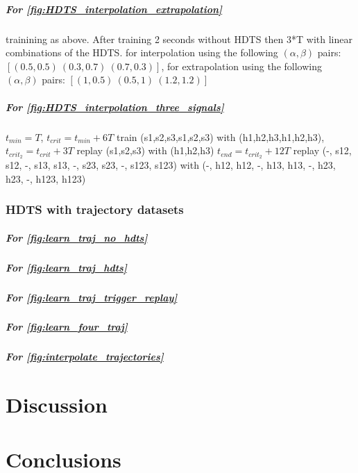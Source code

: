 \documentclass[10pt,a4paper, final]{report} %
\begin{document}
\paragraph{For \autoref{fig:HDTS_interpolation_extrapolation}}
trainining as above. After training 2 seconds without HDTS then 3*T with linear combinations of the HDTS. 
for interpolation using the following $(\alpha, \beta)$ pairs: $[(0.5,0.5)\ (0.3,0.7)\ (0.7,0.3)]$,
for extrapolation using the following $(\alpha, \beta)$ pairs: $[(1, 0.5)\ (0.5, 1)\ (1.2, 1.2)]$

\paragraph{For \autoref{fig:HDTS_interpolation_three_signals}}
$t_{min} = T$,
$t_{crit} = t_{min} + 6 T$ train (s1,s2,s3,s1,s2,s3) with (h1,h2,h3,h1,h2,h3),
$t_{crit_2} = t_{crit} + 3 T$ replay (s1,s2,s3) with (h1,h2,h3)
$t_{end} = t_{crit_2} + 12 T$ replay (-, s12, s12, -, s13, s13, -, s23, s23, -, s123, s123) with 
(-, h12, h12, -, h13, h13, -, h23, h23, -, h123, h123)

\subsection{HDTS with trajectory datasets}

\paragraph{For \autoref{fig:learn_traj_no_hdts}}

\paragraph{For \autoref{fig:learn_traj_hdts}}

\paragraph{For \autoref{fig:learn_traj_trigger_replay}}

\paragraph{For \autoref{fig:learn_four_traj}}

\paragraph{For \autoref{fig:interpolate_trajectories}}

\chapter{Discussion}
\label{cap:discussion}

\chapter{Conclusions}
\label{cap:conclusion}

\nocite{*}


\end{document}
